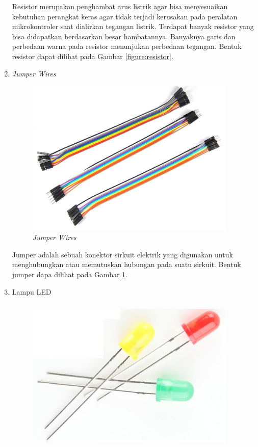 \begin{enumerate}
\begin{figure}[H]
	\end{figure}
	\tab Resistor merupakan penghambat arus listrik agar bisa menyesuaikan kebutuhan perangkat keras agar tidak terjadi kerusakan pada peralatan mikrokontroler saat dialirkan tegangan listrik. Terdapat banyak resistor yang bisa didapatkan berdasarkan besar hambatannya. Banyaknya garis dan perbedaan warna pada resistor menunjukan perbedaan tegangan. Bentuk resistor dapat dilihat pada Gambar \ref{figure:resistor}.
	\pagebreak
	\item \textit{Jumper Wires}
	\begin{figure}[H]
		\centerline {
			\includegraphics[width=10cm,height=7.5cm]{bab5/img/jumper.png}
		}
		\caption{\textit{Jumper Wires}}
		\label{figure:jumper}
	\end{figure}
	\tab Jumper adalah sebuah konektor sirkuit elektrik yang digunakan untuk menghubungkan atau memutuskan hubungan pada suatu sirkuit. Bentuk jumper dapa dilihat pada Gambar \ref{figure:jumper}.
	\pagebreak
	\item Lampu LED
	\begin{figure}[H]
		\centerline {
			\includegraphics[width=10cm,height=7.5cm]{bab5/img/led.png}
}
\end{figure}
\end{enumerate}
